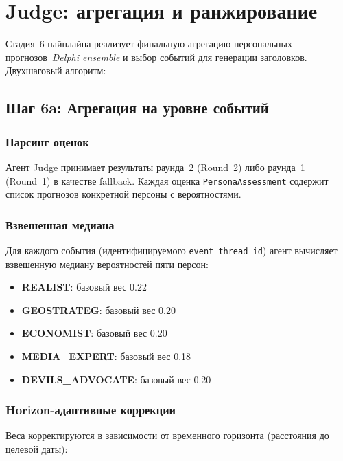 
\section{Judge: агрегация и ранжирование}
\label{sec:judge}

Стадия~6 пайплайна реализует финальную агрегацию персональных прогнозов~\emph{Delphi ensemble} и выбор событий для генерации заголовков. Двухшаговый алгоритм:

\subsection{Шаг 6a: Агрегация на уровне событий}

\subsubsection{Парсинг оценок}

Агент Judge принимает результаты раунда~2 (Round~2) либо раунда~1 (Round~1) в качестве fallback. Каждая оценка \verb|PersonaAssessment| содержит список прогнозов конкретной персоны с вероятностями.

\subsubsection{Взвешенная медиана}

Для каждого события (идентифицируемого \verb|event_thread_id|) агент вычисляет взвешенную медиану вероятностей пяти персон:
\begin{itemize}
  \item \textbf{REALIST}: базовый вес 0.22
  \item \textbf{GEOSTRATEG}: базовый вес 0.20
  \item \textbf{ECONOMIST}: базовый вес 0.20
  \item \textbf{MEDIA\_EXPERT}: базовый вес 0.18
  \item \textbf{DEVILS\_ADVOCATE}: базовый вес 0.20
\end{itemize}

\subsubsection{Horizon-адаптивные коррекции}

Веса корректируются в зависимости от временного горизонта (расстояния до целевой даты):

